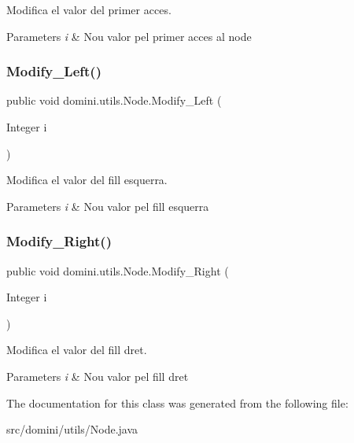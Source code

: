 Modifica el valor del primer acces. 


\begin{DoxyParams}{Parameters}
{\em i} & Nou valor pel primer acces al node \\
\hline
\end{DoxyParams}
\mbox{\label{classdomini_1_1utils_1_1Node_a5a1cbd1e7f1fd78b42050f563520a709}} 
\subsubsection{\texorpdfstring{Modify\+\_\+\+Left()}{Modify\_Left()}}
{\footnotesize\ttfamily public void domini.\+utils.\+Node.\+Modify\+\_\+\+Left (\begin{DoxyParamCaption}\item[{Integer}]{i }\end{DoxyParamCaption})\hspace{0.3cm}{\ttfamily [inline]}}



Modifica el valor del fill esquerra. 


\begin{DoxyParams}{Parameters}
{\em i} & Nou valor pel fill esquerra \\
\hline
\end{DoxyParams}
\mbox{\label{classdomini_1_1utils_1_1Node_a58d22f8330339b6d807cdef44d0eddf6}} 
\subsubsection{\texorpdfstring{Modify\+\_\+\+Right()}{Modify\_Right()}}
{\footnotesize\ttfamily public void domini.\+utils.\+Node.\+Modify\+\_\+\+Right (\begin{DoxyParamCaption}\item[{Integer}]{i }\end{DoxyParamCaption})\hspace{0.3cm}{\ttfamily [inline]}}



Modifica el valor del fill dret. 


\begin{DoxyParams}{Parameters}
{\em i} & Nou valor pel fill dret \\
\hline
\end{DoxyParams}


The documentation for this class was generated from the following file\+:\begin{DoxyCompactItemize}
\item 
src/domini/utils/Node.\+java\end{DoxyCompactItemize}
